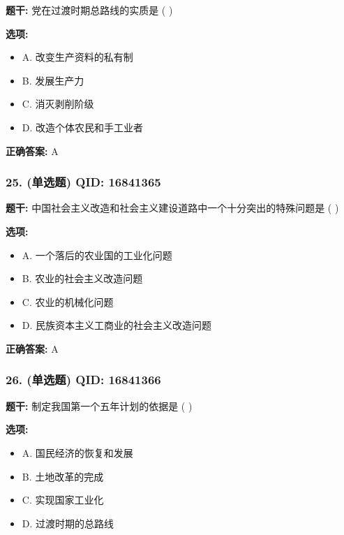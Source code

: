 \documentclass[12pt,UTF8]{ctexart}
\begin{document}
\textbf{题干:}
党在过渡时期总路线的实质是 ( )

\textbf{选项:}
\begin{itemize}[leftmargin=*]

  \item A. 改变生产资料的私有制

  \item B. 发展生产力

  \item C. 消灭剥削阶级

  \item D. 改造个体农民和手工业者

\end{itemize}

\textbf{正确答案:}
A

\vspace{0.3em}\hrulefill\vspace{0.7em}

\subsubsection*{25. (单选题) \small QID: 16841365}

\textbf{题干:}
中国社会主义改造和社会主义建设道路中一个十分突出的特殊问题是 ( )

\textbf{选项:}
\begin{itemize}[leftmargin=*]

  \item A. 一个落后的农业国的工业化问题

  \item B. 农业的社会主义改造问题

  \item C. 农业的机械化问题

  \item D. 民族资本主义工商业的社会主义改造问题

\end{itemize}

\textbf{正确答案:}
A

\vspace{0.3em}\hrulefill\vspace{0.7em}

\subsubsection*{26. (单选题) \small QID: 16841366}

\textbf{题干:}
制定我国第一个五年计划的依据是 ( )

\textbf{选项:}
\begin{itemize}[leftmargin=*]

  \item A. 国民经济的恢复和发展

  \item B. 土地改革的完成

  \item C. 实现国家工业化

  \item D. 过渡时期的总路线

\end{itemize}
\end{document}
